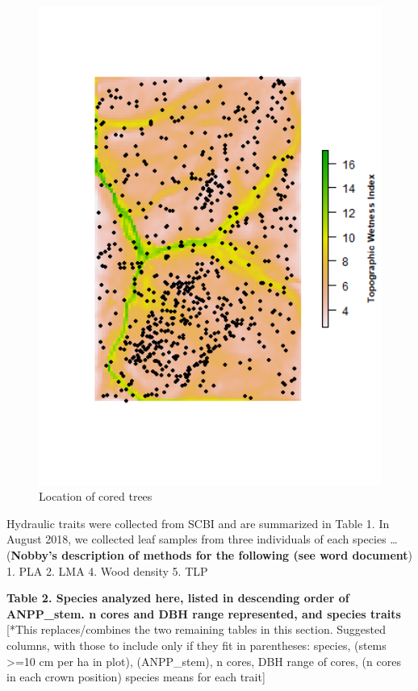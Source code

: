 \documentclass[]{article}
\begin{document}
\begin{figure}[htbp]
\centering
\includegraphics[width=5.20833in]{tables_figures/Figure3.png}
\caption{Location of cored trees}
\end{figure}

Hydraulic traits were collected from SCBI and are summarized in Table 1.
In August 2018, we collected leaf samples from three individuals of each
species \ldots{} (\textbf{Nobby's description of methods for the
following (see word document}) 1. PLA 2. LMA 4. Wood density 5. TLP

\textbf{Table 2. Species analyzed here, listed in descending order of
ANPP\_stem. n cores and DBH range represented, and species traits}
{[}*This replaces/combines the two remaining tables in this section.
Suggested columns, with those to include only if they fit in
parentheses: species, (stems \textgreater{}=10 cm per ha in plot),
(ANPP\_stem), n cores, DBH range of cores, (n cores in each crown
position) species means for each trait{]}
\end{document}

